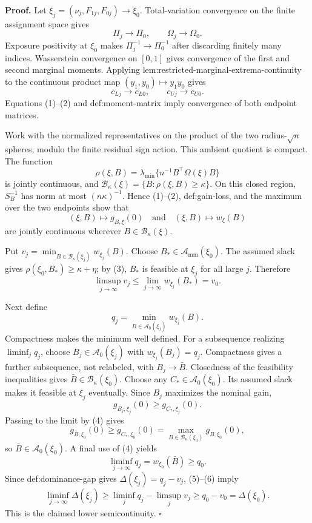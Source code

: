 \textbf{Proof.}
Let \(\xi_j=(\nu_j,F_{1j},F_{0j})\to\xi_0\).  Total-variation convergence on the finite assignment space gives
\[
\Pi_j\to\Pi_0,
\qquad
\Omega_j\to\Omega_0.
\tag{1}
\]
Exposure positivity at \(\xi_0\) makes \(\Pi_j^{-1}\to\Pi_0^{-1}\) after discarding finitely many indices.  Wasserstein convergence on \([0,1]\) gives convergence of the first and second marginal moments.  Applying lem:restricted-marginal-extrema-continuity to the continuous product map \((y_1,y_0)\mapsto y_1y_0\) gives
\[
c_{Lj}\to c_{L0},
\qquad
c_{Uj}\to c_{U0}.
\tag{2}
\]
Equations (1)--(2) and def:moment-matrix imply convergence of both endpoint matrices.

Work with the normalized representatives on the product of the two radius-\(\sqrt n\) spheres, modulo the finite residual sign action.  This ambient quotient is compact.  The function
\[
\rho(\xi,B)=\lambda_{\min}\{n^{-1}B^{\top}\Omega(\xi)B\}
\tag{3}
\]
is jointly continuous, and \(\mathcal B_\kappa(\xi)=\{B:\rho(\xi,B)\ge\kappa\}\).  On this closed region, \(S_B^{-1}\) has norm at most \((n\kappa)^{-1}\).  Hence (1)--(2), def:gain-loss, and the maximum over the two endpoints show that
\[
(\xi,B)\longmapsto g_{B,\xi}(0)
\quad\text{and}\quad
(\xi,B)\longmapsto w_\xi(B)
\tag{4}
\]
are jointly continuous wherever \(B\in\mathcal B_\kappa(\xi)\).

Put \(v_j=\min_{B\in\mathcal B_\kappa(\xi_j)}w_{\xi_j}(B)\).  Choose \(B_*\in\mathcal A_{\mathrm{mm}}(\xi_0)\).  The assumed slack gives \(\rho(\xi_0,B_*)\ge\kappa+\eta\); by (3), \(B_*\) is feasible at \(\xi_j\) for all large \(j\).  Therefore
\[
\limsup_{j\to\infty}v_j
\le\lim_{j\to\infty}w_{\xi_j}(B_*)
=v_0.
\tag{5}
\]

Next define
\[
q_j=\min_{B\in\mathcal A_0(\xi_j)}w_{\xi_j}(B).
\]
Compactness makes the minimum well defined.  For a subsequence realizing \(\liminf_jq_j\), choose \(B_j\in\mathcal A_0(\xi_j)\) with \(w_{\xi_j}(B_j)=q_j\).  Compactness gives a further subsequence, not relabeled, with \(B_j\to\bar B\).  Closedness of the feasibility inequalities gives \(\bar B\in\mathcal B_\kappa(\xi_0)\).  Choose any \(C_*\in\mathcal A_0(\xi_0)\).  Its assumed slack makes it feasible at \(\xi_j\) eventually.  Since \(B_j\) maximizes the nominal gain,
\[
g_{B_j,\xi_j}(0)\ge g_{C_*,\xi_j}(0).
\]
Passing to the limit by (4) gives
\[
g_{\bar B,\xi_0}(0)\ge g_{C_*,\xi_0}(0)
=\max_{B\in\mathcal B_\kappa(\xi_0)}g_{B,\xi_0}(0),
\]
so \(\bar B\in\mathcal A_0(\xi_0)\).  A final use of (4) yields
\[
\liminf_{j\to\infty}q_j
=w_{\xi_0}(\bar B)
\ge q_0.
\tag{6}
\]
Since def:dominance-gap gives \(\Delta(\xi_j)=q_j-v_j\), (5)--(6) imply
\[
\liminf_{j\to\infty}\Delta(\xi_j)
\ge\liminf_jq_j-\limsup_jv_j
\ge q_0-v_0
=\Delta(\xi_0).
\]
This is the claimed lower semicontinuity.  \(\square\)
